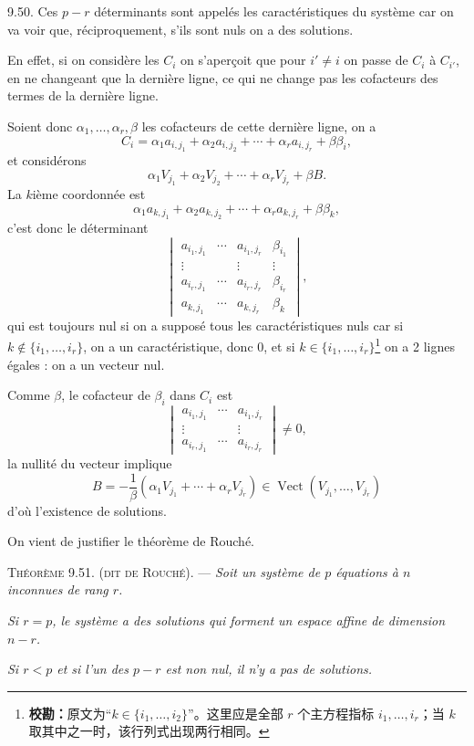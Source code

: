\medskip\noindent\textsc{9.50.} Ces $p-r$ déterminants sont appelés les caractéristiques du système car on va voir que, réciproquement, s'ils sont nuls on a des solutions.

En effet, si on considère les $C_i$ on s'aperçoit que pour $i'\ne i$ on passe de $C_i$ à $C_{i'}$, en ne changeant que la dernière ligne, ce qui ne change pas les cofacteurs des termes de la dernière ligne.

Soient donc $\alpha_1,\ldots,\alpha_r,\beta$ les cofacteurs de cette dernière ligne, on a
\[
C_i=\alpha_1a_{i,j_1}+\alpha_2a_{i,j_2}+\cdots+\alpha_ra_{i,j_r}+\beta\beta_i,
\]
et considérons
\[
\alpha_1V_{j_1}+\alpha_2V_{j_2}+\cdots+\alpha_rV_{j_r}+\beta B.
\]
La $k$ième coordonnée est
\[
\alpha_1a_{k,j_1}+\alpha_2a_{k,j_2}+\cdots+\alpha_ra_{k,j_r}+\beta\beta_k,
\]
c'est donc le déterminant
\[
\begin{vmatrix}
a_{i_1,j_1}&\cdots&a_{i_1,j_r}&\beta_{i_1}\\
\vdots&&\vdots&\vdots\\
a_{i_r,j_1}&\cdots&a_{i_r,j_r}&\beta_{i_r}\\
a_{k,j_1}&\cdots&a_{k,j_r}&\beta_k
\end{vmatrix},
\]
qui est toujours nul si on a supposé tous les caractéristiques nuls car si $k\notin\{i_1,\ldots,i_r\}$, on a un caractéristique, donc 0, et si $k\in\{i_1,\ldots,i_r\}$\footnote{\textbf{校勘：}原文为“$k\in\{i_1,\ldots,i_2\}$”。这里应是全部 $r$ 个主方程指标 $i_1,\ldots,i_r$；当 $k$ 取其中之一时，该行列式出现两行相同。} on a 2 lignes égales : on a un vecteur nul.

Comme $\beta$, le cofacteur de $\beta_i$ dans $C_i$ est
\[
\begin{vmatrix}
a_{i_1,j_1}&\cdots&a_{i_1,j_r}\\
\vdots&&\vdots\\
a_{i_r,j_1}&\cdots&a_{i_r,j_r}
\end{vmatrix}\ne0,
\]
la nullité du vecteur implique
\[
B=-\frac1\beta(\alpha_1V_{j_1}+\cdots+\alpha_rV_{j_r})\in\operatorname{Vect}(V_{j_1},\ldots,V_{j_r})
\]
d'où l'existence de solutions. \bookend

On vient de justifier le théorème de Rouché.

\medskip\noindent\textsc{Théorème 9.51. (dit de Rouché).} --- \emph{Soit un système de $p$ équations à $n$ inconnues de rang $r$.}

\emph{Si $r=p$, le système a des solutions qui forment un espace affine de dimension $n-r$.}

\emph{Si $r<p$ et si l'un des $p-r$  est non nul, il n'y a pas de solutions.}

